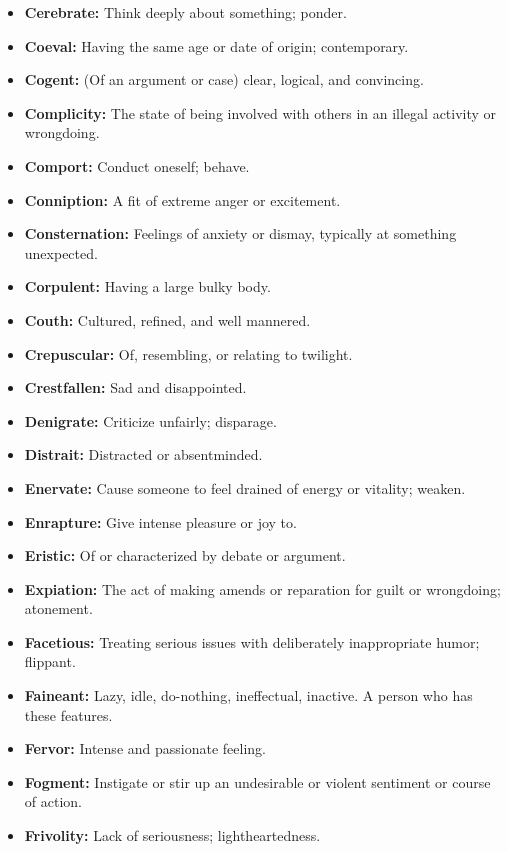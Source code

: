 \documentclass[crop=false,class=book]{standalone}
\begin{document}
\begin{itemize}[noitemsep]
                \item \textbf{Cerebrate:} Think deeply about something; ponder.
                \item \textbf{Coeval:} Having the same age or date of origin; contemporary.
                \item \textbf{Cogent:} (Of an argument or case) clear, logical, and convincing.
                \item \textbf{Complicity:} The state of being involved with others in an illegal activity or wrongdoing.
                \item \textbf{Comport:} Conduct oneself; behave.
                \item \textbf{Conniption:} A fit of extreme anger or excitement.
                \item \textbf{Consternation:} Feelings of anxiety or dismay, typically at something unexpected.
                \item \textbf{Corpulent:} Having a large bulky body.
                \item \textbf{Couth:} Cultured, refined, and well mannered.
                \item \textbf{Crepuscular:} Of, resembling, or relating to twilight.
                \item \textbf{Crestfallen:} Sad and disappointed.
                \item \textbf{Denigrate:} Criticize unfairly; disparage.
                \item \textbf{Distrait:} Distracted or absentminded.
                \item \textbf{Enervate:} Cause someone to feel drained of energy or vitality; weaken.
                \item \textbf{Enrapture:} Give intense pleasure or joy to.
                \item \textbf{Eristic:} Of or characterized by debate or argument.
                \item \textbf{Expiation:} The act of making amends or reparation for guilt or wrongdoing; atonement.
                \item \textbf{Facetious:} Treating serious issues with deliberately inappropriate humor; flippant.
                \item \textbf{Faineant:} Lazy, idle, do-nothing, ineffectual, inactive. A person who has these features.
                \item \textbf{Fervor:} Intense and passionate feeling.
                \item \textbf{Fogment:} Instigate or stir up an undesirable or violent sentiment or course of action.
                \item \textbf{Frivolity:} Lack of seriousness; lightheartedness.




\end{itemize}
\end{document}

